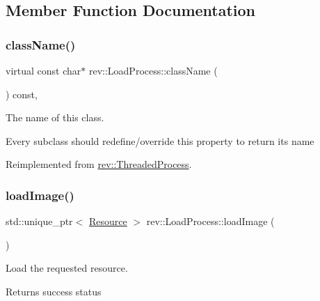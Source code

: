 \subsection{Member Function Documentation}
\mbox{\label{classrev_1_1_load_process_ad826a8b7aab260c491bcd4344564947d}} 
\subsubsection{\texorpdfstring{className()}{className()}}
{\footnotesize\ttfamily virtual const char$\ast$ rev\+::\+Load\+Process\+::class\+Name (\begin{DoxyParamCaption}{ }\end{DoxyParamCaption}) const\hspace{0.3cm}{\ttfamily [inline]}, {\ttfamily [virtual]}}



The name of this class. 

Every subclass should redefine/override this property to return its name 

Reimplemented from \mbox{\hyperlink{classrev_1_1_threaded_process_a7b198a27cb18d6da765cef1ed66a169c}{rev\+::\+Threaded\+Process}}.

\mbox{\label{classrev_1_1_load_process_a709d1f01ffd619787b2f497a76b20e33}} 
\subsubsection{\texorpdfstring{loadImage()}{loadImage()}}
{\footnotesize\ttfamily std\+::unique\+\_\+ptr$<$ \mbox{\hyperlink{classrev_1_1_resource}{Resource}} $>$ rev\+::\+Load\+Process\+::load\+Image (\begin{DoxyParamCaption}{ }\end{DoxyParamCaption})\hspace{0.3cm}{\ttfamily [protected]}}



Load the requested resource. 

Returns success status \mbox{\label{classrev_1_1_load_process_aadfe0ec547dbda51e60517691617e88b}} 

